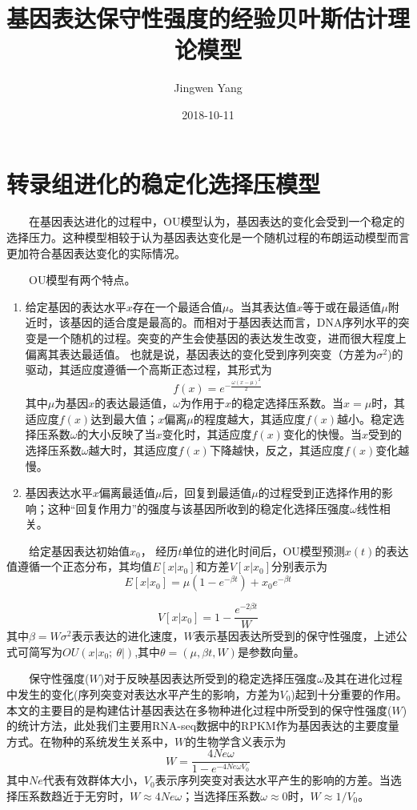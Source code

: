 \documentclass[]{article}
\title{基因表达保守性强度的经验贝叶斯估计理论模型}
\author{Jingwen Yang}
\date{2018-10-11}
\begin{document}
\maketitle

\section{转录组进化的稳定化选择压模型}

  在基因表达进化的过程中，OU模型认为，基因表达的变化会受到一个稳定的选择压力。这种模型相较于认为基因表达变化是一个随机过程的布朗运动模型而言更加符合基因表达变化的实际情况。

  OU模型有两个特点。

\begin{enumerate}
\def\labelenumi{\arabic{enumi}.}
\item
  给定基因的表达水平\(x\)存在一个最适合值\(\mu\)。当其表达值\(x\)等于或在最适值\(\mu\)附近时，该基因的适合度是最高的。而相对于基因表达而言，DNA序列水平的突变是一个随机的过程。突变的产生会使基因的表达发生改变，进而很大程度上偏离其表达最适值。
  也就是说，基因表达的变化受到序列突变（方差为\(\sigma^2\))的驱动，其适应度遵循一个高斯正态过程，其形式为
  \[f\left(x\right)=e^{-\frac{\omega\left(x-\mu\right)^2}{2}}\]
  其中\(\mu\)为基因\(x\)的表达最适值，\(\omega\)为作用于\(x\)的稳定选择压系数。当\(x=\mu\)时，其适应度\(f\left(x\right)\)达到最大值；\(x\)偏离\(\mu\)的程度越大，其适应度\(f(x)\)越小。稳定选择压系数\(\omega\)的大小反映了当\(x\)变化时，其适应度\(f(x)\)变化的快慢。当\(x\)受到的选择压系数\(\omega\)越大时，其适应度\(f(x)\)下降越快，反之，其适应度\(f(x)\)变化越慢。
\item
  基因表达水平\(x\)偏离最适值\(\mu\)后，回复到最适值\(\mu\)的过程受到正选择作用的影响；这种``回复作用力''的强度与该基因所收到的稳定化选择压强度\(\omega\)线性相关。
\end{enumerate}

  给定基因表达初始值\(x_0\)，
经历\(t\)单位的进化时间后，OU模型预测\(x(t)\)的表达值遵循一个正态分布，其均值\(E[x|x_0]\)和方差\(V[x|x_0]\)分别表示为
\[E\left[x|x_0\right]=\mu\left(1-e^{-\beta t}\right)+x_0e^{-\beta t}\]

\[V\left[x|x_0\right]=1-\frac{e^{-2\beta t}}{W}\]
其中\(\beta=W\sigma^2\)表示表达的进化速度，\(W\)表示基因表达所受到的保守性强度，上述公式可简写为\(OU\left(x\left|x_0;\  \theta\right|\right)\),其中\(\theta=(\mu, \beta t, W)\)是参数向量。

  保守性强度(\(W\))对于反映基因表达所受到的稳定选择压强度\(\omega\)及其在进化过程中发生的变化(序列突变对表达水平产生的影响，方差为\(V_0\))起到十分重要的作用。本文的主要目的是构建估计基因表达在多物种进化过程中所受到的保守性强度(\(W\))的统计方法，此处我们主要用RNA-seq数据中的RPKM作为基因表达的主要度量方式。在物种的系统发生关系中，\(W\)的生物学含义表示为
\[W=\frac{4Ne \omega}{1-e^{-4Ne\omega V_0}}\]
其中\(Ne\)代表有效群体大小，\(V_0\)表示序列突变对表达水平产生的影响的方差。当选择压系数趋近于无穷时，\(W\approx4Ne\omega\)；当选择压系数\(\omega\approx0\)时，\(W\approx1/V_0\)。
\end{document}
